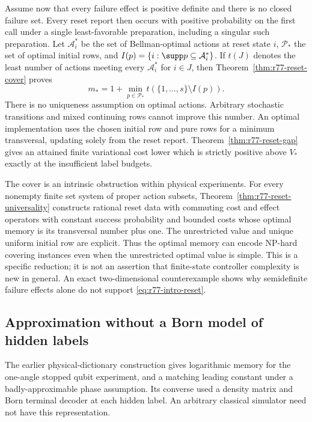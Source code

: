 Assume now that every failure effect is positive definite and there
is no closed failure set.  Every reset report then occurs with positive
probability on the first call under a single least-favorable preparation,
including a singular such preparation.  Let $\mathcal A_i^*$ be the
set of Bellman-optimal actions at reset state $i$, $\mathcal P_*$ the
set of optimal initial rows, and $I(p)=\{i:\supp p\subseteq\mathcal
A_i^*\}$.  If $t(J)$ denotes the least number of actions meeting
every $\mathcal A_i^*$ for $i\in J$, then
Theorem~\ref{thm:r77-reset-cover} proves
\begin{equation}\label{eq:r77-intro-reset}
 m_*=1+\min_{p\in\mathcal P_*}t(\{1,\ldots,s\}\setminus I(p)).
\end{equation}
There is no uniqueness assumption on optimal actions.  Arbitrary
stochastic transitions and mixed continuing rows cannot improve this
number.  An optimal implementation uses the chosen initial row and
pure rows for a minimum transversal, updating solely from the reset
report.  Theorem~\ref{thm:r77-reset-gap} gives an attained finite
variational cost lower which is strictly positive above $V_*$ exactly
at the insufficient label budgets.

The cover is an intrinsic obstruction within physical experiments.
For every nonempty finite set system of proper action subsets,
Theorem~\ref{thm:r77-reset-universality} constructs rational reset
data with commuting cost and effect operators with constant success probability and bounded costs whose
optimal memory is its transversal number plus one.  The unrestricted
value and unique uniform initial row are explicit.  Thus the optimal
memory can encode NP-hard covering instances even when the unrestricted
optimal value is simple.  This is a specific reduction; it is not an
assertion that finite-state controller complexity is new in general.
An exact two-dimensional counterexample shows why semidefinite
failure effects alone do not support \eqref{eq:r77-intro-reset}.

\subsection*{Approximation without a Born model of hidden labels}

The earlier physical-dictionary construction gives logarithmic memory
for the one-angle stopped qubit experiment, and a matching leading
constant under a badly-approximable phase assumption.  Its converse
used a density matrix and Born terminal decoder at each hidden label.
An arbitrary classical simulator need not have this representation.

